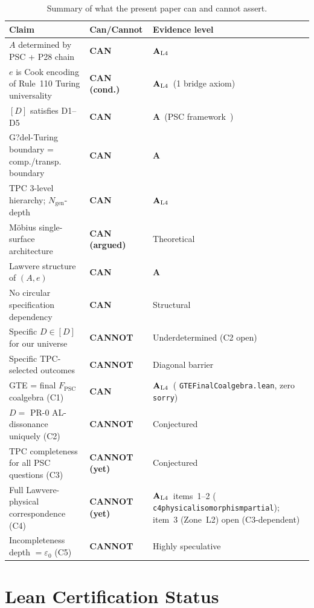\documentclass[12pt,letterpaper]{article}
\newcommand{\Dclass}{[D]}
\newcommand{\ngen}{N_{\mathrm{gen}}}
\newcommand{\catAL}{\ensuremath{\textbf{A}_{\rm L4}}}
\newcommand{\catA}{\textbf{A}}
\newcommand{\lean}[1]{%
  \penalty-100
  \begingroup\def\_{\textunderscore\allowbreak}\texttt{#1}\endgroup}
\begin{document}
\begin{table}[h!]
\centering
\small
\begin{tabular}{p{} p{} p{}}
\toprule
\textbf{Claim} & \textbf{Can/Cannot} & \textbf{Evidence level} \\
\midrule
$A$ determined by PSC + P28 chain
  & \textbf{CAN} & \catAL \\
$e$ is Cook encoding of Rule~110 Turing universality
  & \textbf{CAN (cond.)} & \catAL\ (1 bridge axiom) \\
$\Dclass$ satisfies D1--D5
  & \textbf{CAN} & \catA\ (PSC framework~\cite{SpivackNEMS10,SpivackNEMS11,SpivackBornRule,SpivackPhiMDLField}) \\
G?del-Turing boundary = comp./transp. boundary
  & \textbf{CAN} & \catA \\
TPC 3-level hierarchy; $\ngen$-depth
  & \textbf{CAN} & \catAL \\
M\"{o}bius single-surface architecture
  & \textbf{CAN (argued)} & Theoretical \\
Lawvere structure of $(A, e)$
  & \textbf{CAN} & \catA \\
No circular specification dependency
  & \textbf{CAN} & Structural \\
Specific $D \in \Dclass$ for our universe
  & \textbf{CANNOT} & Underdetermined (C2 open) \\
Specific TPC-selected outcomes
  & \textbf{CANNOT} & Diagonal barrier \\
GTE = final $F_{\mathrm{PSC}}$ coalgebra (C1)
  & \textbf{CAN} & \catAL\ (\lean{GTEFinalCoalgebra.lean}, zero \texttt{sorry}) \\
$D = $ PR-0 AL-dissonance uniquely (C2)
  & \textbf{CANNOT} & Conjectured \\
TPC completeness for all PSC questions (C3)
  & \textbf{CANNOT (yet)} & Conjectured \\
Full Lawvere-physical correspondence (C4)
  & \textbf{CANNOT (yet)} & \catAL\ items~1--2 (\lean{c4\_physical\_isomorphism\_partial}); item~3 (Zone~L2) open (C3-dependent) \\
Incompleteness depth $= \varepsilon_0$ (C5)
  & \textbf{CANNOT} & Highly speculative \\
\bottomrule
\end{tabular}
\caption{Summary of what the present paper can and cannot assert.}
\label{tab:cannotbe}
\end{table}

\section{Lean Certification Status}
\label{app:lean}
\end{document}

